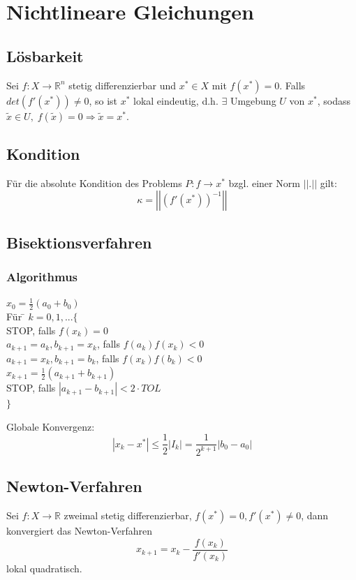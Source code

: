 \documentclass[a4paper,twocolumn,10pt]{article}
\begin{document}
\section{Nichtlineare Gleichungen}

\subsection{Lösbarkeit}
Sei $f:X\rightarrow\mathbb{R}^n$ stetig differenzierbar und $x^*\in X$ mit $f(x^*)=0$. Falls $det(f'(x^*))\neq 0$, so ist $x^*$ lokal eindeutig, d.h. $\exists$ Umgebung $U$ von $x^*$, sodass $\tilde{x}\in U,\;f(\tilde{x})=0\Rightarrow\tilde{x}=x^*$.

\subsection{Kondition}
Für die absolute Kondition des Problems $P:f\rightarrow x^*$ bzgl. einer Norm $||.||$ gilt:
\begin{equation*}
\kappa=\left|\left|\left(f'(x^*)\right)^{-1}\right|\right|
\end{equation*}

\subsection{Bisektionsverfahren}

\subsubsection{Algorithmus}
\begin{tabbing}
$x_0=\frac{1}{2}(a_0+b_0)$\\
Für \= $k=0,1,...\{$\\
\>STOP, falls $f(x_k)=0$\\
\>$a_{k+1}=a_k,b_{k+1}=x_k$, falls $f(a_k)f(x_k)<0$\\
\>$a_{k+1}=x_k,b_{k+1}=b_k$, falls $f(x_k)f(b_k)<0$\\
\>$x_{k+1}=\frac{1}{2}(a_{k+1}+b_{k+1})$\\
\>STOP, falls $|a_{k+1}-b_{k+1}|<2\cdot TOL$\\
$\}$
\end{tabbing}
Globale Konvergenz:
\begin{equation*}
|x_k-x^*|\leq\frac{1}{2}|I_k|=\frac{1}{2^{k+1}}|b_0-a_0|
\end{equation*}

\subsection{Newton-Verfahren}
Sei $f:X\rightarrow\mathbb{R}$ zweimal stetig differenzierbar, $f(x^*)=0,f'(x^*)\neq 0$, dann konvergiert das Newton-Verfahren
\begin{equation*}
x_{k+1}=x_k-\frac{f(x_k)}{f'(x_k)}
\end{equation*}
lokal quadratisch.
\end{document}

